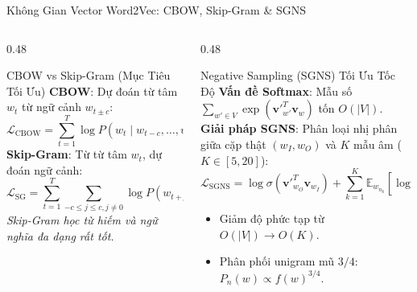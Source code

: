 \documentclass[aspectratio=169, 10pt]{beamer}
\begin{document}
\begin{frame}{Không Gian Vector Word2Vec: CBOW, Skip-Gram \& SGNS}
  \begin{columns}[T, onlytextwidth]
    \begin{column}{0.48\textwidth}
      \begin{block}{CBOW vs Skip-Gram (Mục Tiêu Tối Ưu)}
        \fontsize{7.5}{9.5}\selectfont
        \textbf{CBOW}: Dự đoán từ tâm $w_t$ từ ngữ cảnh $w_{t\pm c}$:
        $$\displaystyle \mathcal{L}_{\text{CBOW}} = \sum_{t=1}^T \log P(w_t \mid w_{t-c}, \dots, w_{t+c})$$
        \textbf{Skip-Gram}: Từ từ tâm $w_t$, dự đoán ngữ cảnh:
        $$\displaystyle \mathcal{L}_{\text{SG}} = \sum_{t=1}^T \sum_{-c \le j \le c, j \ne 0} \log P(w_{t+j} \mid w_t)$$
        \textit{Skip-Gram học từ hiếm và ngữ nghĩa đa dạng rất tốt.}
      \end{block}
    \end{column}
    \hfill
    \begin{column}{0.48\textwidth}
      \begin{alertblock}{Negative Sampling (SGNS) Tối Ưu Tốc Độ}
        \fontsize{7.5}{9.5}\selectfont
        \textbf{Vấn đề Softmax}: Mẫu số $\sum_{w' \in V} \exp(\mathbf{v}'^T_{w'} \mathbf{v}_w)$ tốn $O(|V|)$.\\
        \textbf{Giải pháp SGNS}: Phân loại nhị phân giữa cặp thật $(w_I, w_O)$ và $K$ mẫu âm ($K \in [5, 20]$):
        $$\displaystyle \mathcal{L}_{\text{SGNS}} = \log \sigma(\mathbf{v}'^T_{w_O} \mathbf{v}_{w_I}) + \sum_{k=1}^K \mathbb{E}_{w_{n_k}} \left[ \log \sigma(-\mathbf{v}'^T_{w_{n_k}} \mathbf{v}_{w_I}) \right]$$
        \begin{itemize}\setlength{\itemsep}{0.15em}
          \item Giảm độ phức tạp từ $O(|V|) \to O(K)$.
          \item Phân phối unigram mũ $3/4$: $P_n(w) \propto f(w)^{3/4}$.
        \end{itemize}
      \end{alertblock}
    \end{column}
  \end{columns}
\end{frame}
\end{document}
